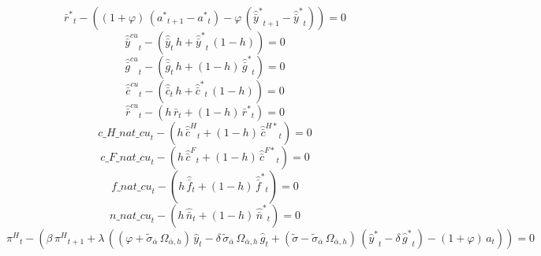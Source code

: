 \begin{dmath}
{{\bar r^*}}_{t}-\left(\left(1+{{\varphi}}\right)\, \left({{a^*}}_{t+1}-{{a^*}}_{t}\right)-{{\varphi}}\, \left({{\hat {\bar y}^*}}_{t+1}-{{\hat {\bar y}^*}}_{t}\right)\right)=0
\end{dmath}
\begin{dmath}
{{\hat {\bar y}^{cu}}}_{t}-\left({{\hat {\bar y}}}_{t}\, {{h}}+{{\hat {\bar y}^*}}_{t}\, \left(1-{{h}}\right)\right)=0
\end{dmath}
\begin{dmath}
{{\hat {\bar g}^{cu}}}_{t}-\left({{\hat {\bar g}}}_{t}\, {{h}}+\left(1-{{h}}\right)\, {{\hat {\bar g}^*}}_{t}\right)=0
\end{dmath}
\begin{dmath}
{{\hat {\bar c}^{cu}}}_{t}-\left({{\hat {\bar c}}}_{t}\, {{h}}+{{\hat {\bar c}^*}}_{t}\, \left(1-{{h}}\right)\right)=0
\end{dmath}
\begin{dmath}
{{\hat {\bar r}^{cu}}}_{t}-\left({{h}}\, {{\bar r}}_{t}+\left(1-{{h}}\right)\, {{\bar r^*}}_{t}\right)=0
\end{dmath}
\begin{dmath}
{c\_H\_nat\_cu}_{t}-\left({{h}}\, {{\hat {\bar c}^H}}_{t}+\left(1-{{h}}\right)\, {{\hat {\bar c}^{H*}}}_{t}\right)=0
\end{dmath}
\begin{dmath}
{c\_F\_nat\_cu}_{t}-\left({{h}}\, {{\hat {\bar c}^F}}_{t}+\left(1-{{h}}\right)\, {{\hat {\bar c}^{F*}}}_{t}\right)=0
\end{dmath}
\begin{dmath}
{f\_nat\_cu}_{t}-\left({{h}}\, {{\hat {\bar f}}}_{t}+\left(1-{{h}}\right)\, {{\hat {\bar f}^*}}_{t}\right)=0
\end{dmath}
\begin{dmath}
{n\_nat\_cu}_{t}-\left({{h}}\, {{\hat {\bar n}}}_{t}+\left(1-{{h}}\right)\, {{\hat {\bar n}^*}}_{t}\right)=0
\end{dmath}
\begin{dmath}
{{\pi^H}}_{t}-\left({{\beta}}\, {{\pi^H}}_{t+1}+{{\lambda}}\, \left(\left({{\varphi}}+{{\tilde\sigma_{\bar{\alpha}}}}\, {{\Omega_{\bar \alpha,h}}}\right)\, {{\hat y}}_{t}-{{\delta}}\, {{\tilde\sigma_{\bar{\alpha}}}}\, {{\Omega_{\bar \alpha,h}}}\, {{\hat g}}_{t}+\left({{\tilde{\sigma}}}-{{\tilde\sigma_{\bar{\alpha}}}}\, {{\Omega_{\bar \alpha,h}}}\right)\, \left({{\hat y^*}}_{t}-{{\delta}}\, {{\hat g^*}}_{t}\right)-\left(1+{{\varphi}}\right)\, {{a}}_{t}\right)\right)=0
\end{dmath}
